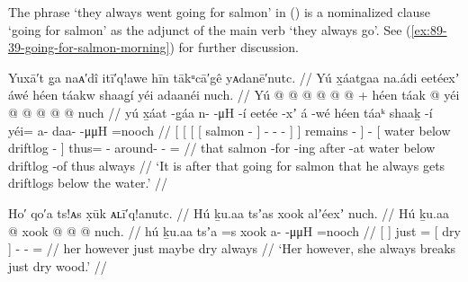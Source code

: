 The phrase  ‘they always went going for salmon’ in (\lastx) is a nominalized clause  ‘going for salmon’ as the adjunct of the main verb  ‘they always go’.
See (\ref{ex:89-39-going-for-salmon-morning}) for further discussion.

\ex\label{ex:89-23-go-for-wet-wood}%
%
\begingl
	\glpreamble	Yuxā′t g̣a naᴀ′dî itī′q!awe hīn tākᵘcā′gê yᴀdanē′nutc. //
	\glpreamble	Yú x̱áatg̱aa na.ádi eetéexʼ áwé héen táakw shaag̱í yéi adaanéi nuch. //
	\gla	{} {} Yú {} {}  @ {} {}
				 @ {} @ {} @ {} {} {}
			 @ {} {} 
		 @ {} +
		{} héen táak  @ {} {}
		yéi @  @ {} @ {} @ {} @ \•nuch //
	\glb	{} {} yú {} {} x̱áat -g̱áa {} n-  -μH -í {} {} eetée -xʼ {}
		á -wé
		{} héen táaᵏ shaaḵ -í {}
		yéi= a- daa-  -μμH =nooch //
	\glc	{}[ {}[  {}[ {}[ salmon - {}]
				-  - - {}] {}]
			remains - {}]
		 -
		{}[ water below driftlog - {}]
		thus= - around-  - = //
	\gld	{} {} that {} {} salmon -for {}
				 {} {} -ing {} {}
			after -at {}
		 {}
		{} water below driftlog -of {}
		thus  {} {} {} \•always //
	\glft	‘It is after that going for salmon that he always gets driftlogs below the water.’
		//
\endgl
\xe

\ex\label{ex:89-24-break-dry-wood}%
%
\begingl
	\glpreamble	Ho′ qo′a ts!ᴀs x̣ūk ᴀʟī′q!anutc. //
	\glpreamble	Hú ḵu.aa tsʼas xook alʼéexʼ nuch. //
	\gla	{} Hú {} ḵu.aa  @ {}
		{} xook {} 
		 @ {} @ {} @ \•nuch. //
	\glb	{} hú {} ḵu.aa tsʼa =s
		{} xook {}
		a-  -μμH\hspace{1.25em} =nooch //
	\glc	{}[  {}]  just =
		{}[ dry {}]
		-  - = //
	\gld	{} her {} however just \•maybe
		{} dry {}
		 {} {} \•always //
	\glft	‘Her however, she always breaks just dry wood.’
		//
\endgl
\xe

